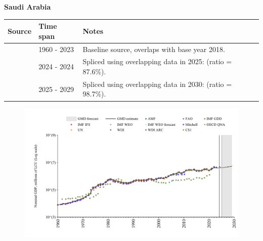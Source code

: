 \documentclass[12pt,a4paper,landscape]{article}
\begin{document}
\begin{adjustbox}{max totalsize={\paperwidth}{\paperheight},center}
\begin{minipage}[t][\textheight][t]{\textwidth}
\vspace*{0.5cm}
{}
\begin{center}
{\Large\bfseries Saudi Arabia}
\end{center}
\vspace{0.5cm}
\begin{table}[H]
\centering
\small
\begin{tabular}{|l|l|l|}
\hline
\textbf{Source} & \textbf{Time span} & \textbf{Notes} \\
\hline
\rowcolor{white}\cite{WDI}& 1960 - 2023 &Baseline source, overlaps with base year 2018.\\
\rowcolor{lightgray}\cite{IMF_IFS}& 2024 - 2024 &Spliced using overlapping data in 2025: (ratio = 87.6\%).\\
\rowcolor{white}\cite{IMF_WEO_forecast}& 2025 - 2029 &Spliced using overlapping data in 2030: (ratio = 98.7\%).\\
\hline
\end{tabular}
\end{table}
\begin{figure}[H]
\centering
\includegraphics[width=\textwidth,height=0.6\textheight,keepaspectratio]{graphs/SAU_nGDP.pdf}
\end{figure}
\end{minipage}
\end{adjustbox}
\end{document}
